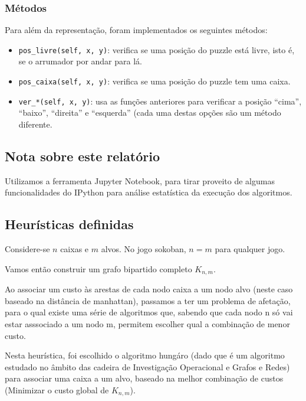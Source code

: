 \documentclass[11pt]{article}
\begin{document}
\hypertarget{muxe9todos}{%
\subsubsection{Métodos}\label{muxe9todos}}

Para além da representação, foram implementados os seguintes métodos:

\begin{itemize}
\item
  \texttt{pos\_livre(self,\ x,\ y)}: verifica se uma posição do puzzle
  está livre, isto é, se o arrumador por andar para lá.
\item
  \texttt{pos\_caixa(self,\ x,\ y)}: verifica se uma posição do puzzle
  tem uma caixa.
\item
  \texttt{ver\_*(self,\ x,\ y)}: usa as funções anteriores para
  verificar a posição ``cima'', ``baixo'', ``direita'' e ``esquerda''
  (cada uma destas opções são um método diferente.
\end{itemize}

\hypertarget{nota-sobre-este-relatuxf3rio}{%
\subsection{Nota sobre este
relatório}\label{nota-sobre-este-relatuxf3rio}}

Utilizamos a ferramenta Jupyter Notebook, para tirar proveito de algumas
funcionalidades do IPython para análise estatística da execução dos
algoritmos.

    \hypertarget{heuruxedsticas-definidas}{%
\subsection{Heurísticas definidas}\label{heuruxedsticas-definidas}}

    Considere-se \(n\) caixas e \(m\) alvos. No jogo sokoban, \(n=m\) para
qualquer jogo.

    Vamos então construir um grafo bipartido completo \(K_{n,m}\).

    Ao associar um custo às arestas de cada nodo caixa a um nodo alvo (neste
caso baseado na distância de manhattan), passamos a ter um problema de
afetação, para o qual existe uma série de algoritmos que, sabendo que
cada nodo n só vai estar asssociado a um nodo m, permitem escolher qual
a combinação de menor custo.

    Nesta heurística, foi escolhido o algoritmo hungáro (dado que é um
algoritmo estudado no âmbito das cadeira de Investigação Operacional e
Grafos e Redes) para associar uma caixa a um alvo, baseado na melhor
combinação de custos (Minimizar o custo global de \(K_{n,m}\)).
\end{document}
